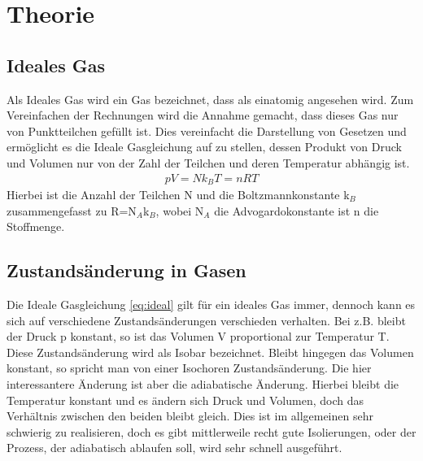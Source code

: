 \documentclass[12pt,a4paper,titlepage,headinclude,bibtotoc]{scrartcl}
\begin{document}
\section{Theorie}
\label{sec:theorie}

\subsection{Ideales Gas}
Als Ideales Gas wird ein Gas bezeichnet, dass als einatomig angesehen wird.
Zum Vereinfachen der Rechnungen wird die Annahme gemacht, dass dieses Gas nur von Punktteilchen gefüllt ist.
Dies vereinfacht die Darstellung von Gesetzen und ermöglicht es die Ideale Gasgleichung auf zu stellen, dessen Produkt von Druck und Volumen nur von der Zahl der Teilchen und deren Temperatur abhängig ist.
\begin{align}
	pV=Nk_BT=nRT\label{eq:ideal}
\end{align}
Hierbei ist die Anzahl der Teilchen N und die Boltzmannkonstante k$_B$ zusammengefasst zu R=N$_A$k$_B$, wobei N$_A$ die Advogardokonstante ist n die Stoffmenge.
\cite[S. 261]{gerthsen}

\subsection{Zustandsänderung in Gasen}
Die Ideale Gasgleichung \eqref{eq:ideal} gilt für ein ideales Gas immer, dennoch kann es sich auf verschiedene Zustandsänderungen verschieden verhalten.
Bei z.B. bleibt der Druck p konstant, so ist das Volumen V proportional zur Temperatur T.
Diese Zustandsänderung wird als Isobar bezeichnet.
Bleibt hingegen das Volumen konstant, so spricht man von einer Isochoren Zustandsänderung.
Die hier interessantere Änderung ist aber die adiabatische Änderung.
Hierbei bleibt die Temperatur konstant und es ändern sich Druck und Volumen, doch das Verhältnis zwischen den beiden bleibt gleich.
Dies ist im allgemeinen sehr schwierig zu realisieren, doch es gibt mittlerweile recht gute Isolierungen, oder der Prozess, der adiabatisch ablaufen soll, wird sehr schnell ausgeführt.
\end{document}
